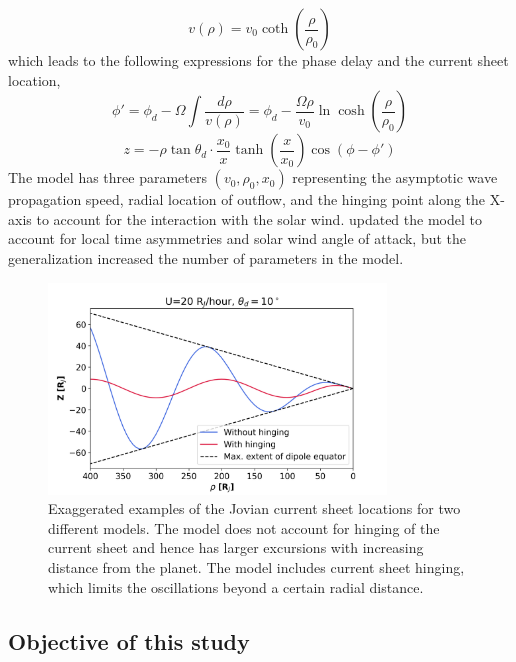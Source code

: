 \begin{equation}
    v(\rho) = v_0 \coth \left(\frac{\rho}{\rho_0} \right)
\end{equation}
which leads to the following expressions for the phase delay and the current sheet location,
\begin{equation}
    \phi' = \phi_d - \Omega \int \frac{d\rho}{v(\rho)} = \phi_d - \frac{\Omega \rho}{v_0} \ln \cosh \left( \frac{\rho}{\rho_0} \right) 
\end{equation}
\begin{equation}
    z = -\rho \tan\theta_d \cdot \frac{x_0}{x} \tanh\left(\frac{x}{x_0} \right) \cos\left( \phi - \phi'\right) 
    \label{eqn:khurana1992}
\end{equation}
The  model has three parameters $(v_0, \rho_0, x_0)$ representing the asymptotic wave propagation speed, radial location of outflow, and the hinging point along the X-axis to account for the interaction with the solar wind.  updated the model to account for local time asymmetries and solar wind angle of attack, but the generalization increased the number of parameters in the model. 

\begin{figure}
    \centering
    \includegraphics[width=0.8\textwidth]{images5/example-hinging.png}
    \caption{Exaggerated examples of the Jovian current sheet locations for two different models. The \protect{} model does not account for hinging of the current sheet and hence has larger excursions with increasing distance from the planet. The \protect{} model includes current sheet hinging, which limits the oscillations beyond a certain radial distance.}
    \label{fig:example-hinging}
\end{figure}

\subsection{Objective of this study}

